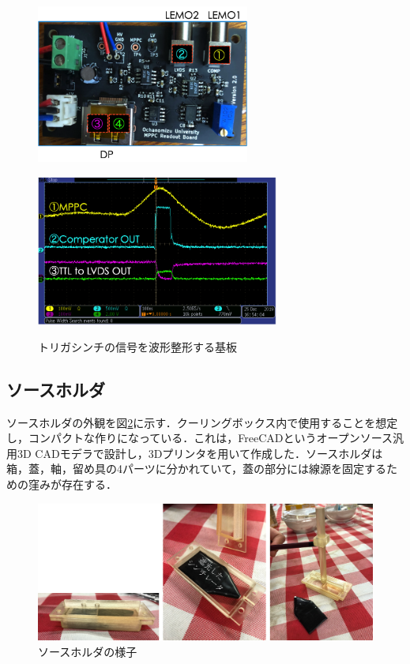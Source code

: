 \begin{figure}[h]
  \centering
  \begin{minipage}[b]{0.45\linewidth}
    \centering
    \includegraphics[width=7cm]{./figure/pcb.png}
    \label{fig:pcb}
  \end{minipage}
  \begin{minipage}[b]{0.45\linewidth}
    \centering
    \includegraphics[width=8cm]{./figure/pcbosiro.png}
    \label{fig:extosiro}
  \end{minipage}
  \caption{トリガシンチの信号を波形整形する基板}
\end{figure}


\subsection{ソースホルダ}
ソースホルダの外観を図\ref{fig:sourceholder}に示す．クーリングボックス内で使用することを想定し，コンパクトな作りになっている．これは，FreeCADというオープンソース汎用3D CADモデラで設計し，3Dプリンタを用いて作成した．ソースホルダは箱，蓋，軸，留め具の4パーツに分かれていて，蓋の部分には線源を固定するための窪みが存在する．

\begin{figure}[h]
  \centering
  \includegraphics[width=15cm]{./figure/sourceholder.png}
  \caption{ソースホルダの様子}
  \label{fig:sourceholder}
\end{figure}

